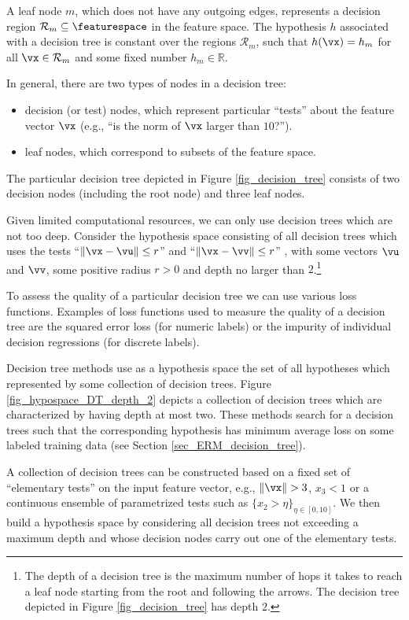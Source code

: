 \documentclass[12pt]{report}
\begin{document}
A leaf node $m$, which does not have any outgoing edges, 
represents a decision region $\mathcal{R}_{m} \subseteq \featurespace$ in 
the feature space. The hypothesis $h$ associated with a decision tree 
is constant over the regions $\mathcal{R}_{m}$, such that $h(\vx) = h_{m}$ 
for all $\vx \in \mathcal{R}_{m}$ and some fixed number $h_{m} \in \mathbb{R}$. 

In general, there are two types of nodes in a decision tree: 
\begin{itemize} 
\item decision (or test) nodes, which represent particular ``tests'' 
about the feature vector $\vx$ (e.g., ``is the norm of $\vx$ larger than $10$?'').
\item leaf nodes, which correspond to subsets of the feature space. 
\end{itemize} 
The particular decision tree depicted in Figure \ref{fig_decision_tree} consists 
of two decision nodes (including the root node) and three leaf nodes. 

Given limited computational resources, we can only use decision 
trees which are not too deep. Consider the hypothesis space consisting 
of all decision trees which uses the tests ``$\| \vx - \vu \| \leq r$'' and  
``$\| \vx - \vv \| \leq r$'' , with some vectors $\vu$ and $\vv$, some positive 
radius $r >0$ and depth no larger than $2$.\footnote{The depth of a decision tree 
	is the maximum number of hops it takes to reach a leaf node starting 
	from the root and following the arrows. The decision tree depicted in Figure \ref{fig_decision_tree} has depth $2$.} 

To assess the quality of a particular decision tree we can use various  
loss functions. Examples of loss functions used to measure the quality 
of a decision tree are the squared error loss (for numeric labels) or the 
impurity of individual decision regressions (for discrete labels). 

Decision tree methods use as a hypothesis space the set of all hypotheses 
which represented by some collection of decision trees.  Figure \ref{fig_hypospace_DT_depth_2} 
depicts a collection of decision trees which are characterized by having depth at most two. 
These methods search for a decision trees such that the corresponding hypothesis has 
minimum average loss on some labeled training data (see Section \ref{sec_ERM_decision_tree}). 

A collection of decision trees can be constructed based on a fixed set of 
``elementary tests'' on the input feature vector, e.g., $\| \vx \| > 3$, $x_{3} < 1$ 
or a continuous ensemble of parametrized tests such as $\{ x_{2} > \eta \}_ {\eta \in [0,10]}$. 
We then build a hypothesis space by considering all decision trees not 
exceeding a maximum depth and whose decision nodes carry out one of the 
elementary tests. 
\end{document}
